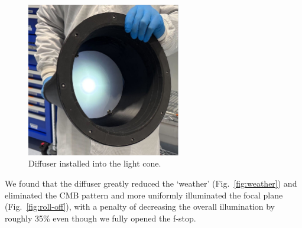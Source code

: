 \begin{figure}[ht]
\centering
\includegraphics[width=0.6\textwidth]{figures/Diffuser.jpg}
\caption{Diffuser installed into the light cone.}
\label{fig:diffuser}
\end{figure}

We found that the diffuser greatly reduced the `weather' (Fig.~\ref{fig:weather}) and eliminated the CMB pattern and more uniformly illuminated the focal plane (Fig.~\ref{fig:roll-off}), with a penalty of decreasing the overall illumination by roughly 35\% even though we fully opened the f-stop.


